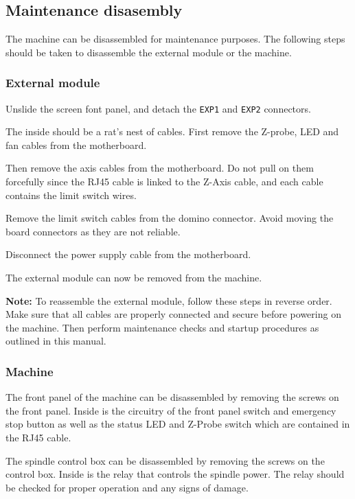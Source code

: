 \documentclass[11pt, openright]{book}
\begin{document}
     \subsection{Maintenance disasembly}

    The machine can be disassembled for maintenance purposes. The following steps should be taken to disassemble the external module or the machine. 

     \subsubsection{External module}

     Unslide the screen font panel, and detach the \texttt{EXP1} and \texttt{EXP2} connectors.

     The inside should be a rat's nest of cables. First remove the Z-probe, LED and fan cables from the motherboard. 
     
     Then remove the axis cables from the motherboard. Do not pull on them forcefully since the RJ45 cable is linked to the Z-Axis cable, and each cable contains the limit switch wires.

     Remove the limit switch cables from the domino connector. Avoid moving the board connectors as they are not reliable.

     Disconnect the power supply cable from the motherboard.

    The external module can now be removed from the machine.


     \begin{dent}{\textbf{Note:}}
        To reassemble the external module, follow these steps in reverse order. Make sure that all cables are properly connected and secure before powering on the machine. Then perform maintenance checks and startup procedures as outlined in this manual.
    \end{dent}

    \subsubsection{Machine}

    The front panel of the machine can be disassembled by removing the screws on the front panel. Inside is the circuitry of the front panel switch and emergency stop button as well as the status LED and Z-Probe switch which are contained in the RJ45 cable.

    The spindle control box can be disassembled by removing the screws on the control box. Inside is the relay that controls the spindle power. The relay should be checked for proper operation and any signs of damage.
\end{document}
